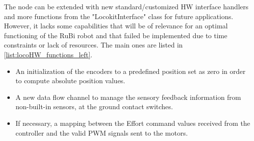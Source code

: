 The node can be extended with new standard/customized HW interface handlers and more functions from the "LocokitInterface" class for future applications.
However, it lacks some capabilities that will be of relevance for an optimal functioning of the RuBi robot and that failed be implemented due to time constraints or lack of resources. 
The main ones are listed in \ref{list:locoHW_functions_left}.

\begin{itemize}
\label{list:locoHW_functions_left}
	\item An initialization of the encoders to a predefined position set as zero in order to compute absolute position values.
	\item A new data flow channel to manage the sensory feedback information from non-built-in sensors, at the ground contact switches.
	\item If necessary, a mapping between the Effort command values received from the controller and the valid PWM signals sent to the motors.  
\end{itemize}

